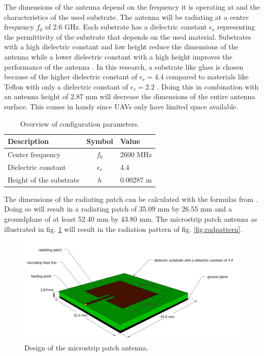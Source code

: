 \documentclass[twocolumn]{phdsymp} %
\begin{document}
The dimensions of the antenna depend on the frequency it is operating at and the characteristics of the used substrate.
The antenna will be radiating at a centre frequency $f_0$ of 2.6 GHz. Each substrate has a dielectric constant $\epsilon_r$ representing 
the permittivity of the substrate that depends on the used material.
Substrates with a high dielectric constant and low height 
reduce the dimensions of the antenna
while a lower dielectric constant with a high height improves the performance of the antenna \cite{J14_antennadesign,J15_antennadesign}. 
In this research, a substrate like glass 
is chosen because of the higher dielectric constant of $\epsilon_r = 4.4$ compared to materials like Teflon with only a dielectric 
constant of $\epsilon_r = 2.2$ \cite{J14_antennadesign}. 
Doing this in combination with an antenna height of 2.87 mm will decrease the dimensions of the entire antenna surface.
This comes in handy since \gls{UAV}s only have limited space available.
\begin{table}[h!]
\centering
\begin{tabular}{|l|c|l|}
\hline
 Description            & Symbol          & Value         \\    \hline
 Center frequency       & $f_0$           & 2600 MHz       \\ 
 Dielectric constant    & $\epsilon_r$    & 4.4         \\ 
 Height of the substrate & $h$             & 0.00287 m    \\ \hline
\end{tabular}
\caption{Overview of configuration parameters.}
\label{table:antennaparas}
\end{table}

The dimensions of the radiating patch can be calculated with the formulas from \cite{J14_antennadesign,J15_antennadesign}.
Doing so will result in a radiating patch of 35.09 mm by 26.55 mm and a groundplane of at least 52.40 mm by 43.80 mm.
The microstrip patch antenna as illustrated in fig. \ref{fig:basicpatchantenna} will result in the radiation pattern of fig. \ref{fig:radpattern}.

\vspace{ 6.4 mm}

\begin{figure}[h!]
\centering
  \includegraphics[width=\linewidth]{MicrostripAntenna.png}
  \caption{Design of the microstrip patch antenna.}
  \label{fig:basicpatchantenna}
\end{figure}
\end{document}
